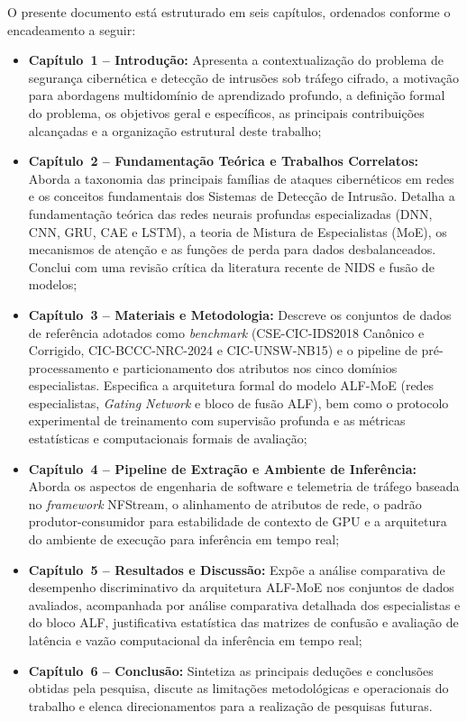 O presente documento está estruturado em seis capítulos, ordenados conforme o encadeamento a seguir:
\begin{itemize}
    \item \textbf{Capítulo~1 -- Introdução:} Apresenta a contextualização do problema de segurança cibernética e detecção de intrusões sob tráfego cifrado, a motivação para abordagens multidomínio de aprendizado profundo, a definição formal do problema, os objetivos geral e específicos, as principais contribuições alcançadas e a organização estrutural deste trabalho;
    \item \textbf{Capítulo~2 -- Fundamentação Teórica e Trabalhos Correlatos:} Aborda a taxonomia das principais famílias de ataques cibernéticos em redes e os conceitos fundamentais dos Sistemas de Detecção de Intrusão. Detalha a fundamentação teórica das redes neurais profundas especializadas (DNN, CNN, GRU, CAE e LSTM), a teoria de Mistura de Especialistas (MoE), os mecanismos de atenção e as funções de perda para dados desbalanceados. Conclui com uma revisão crítica da literatura recente de NIDS e fusão de modelos;
    \item \textbf{Capítulo~3 -- Materiais e Metodologia:} Descreve os conjuntos de dados de referência adotados como \emph{benchmark} (CSE-CIC-IDS2018 Canônico e Corrigido, CIC-BCCC-NRC-2024 e CIC-UNSW-NB15) e o pipeline de pré-processamento e particionamento dos atributos nos cinco domínios especialistas. Especifica a arquitetura formal do modelo ALF-MoE (redes especialistas, \emph{Gating Network} e bloco de fusão ALF), bem como o protocolo experimental de treinamento com supervisão profunda e as métricas estatísticas e computacionais formais de avaliação;
    \item \textbf{Capítulo~4 -- Pipeline de Extração e Ambiente de Inferência:} Aborda os aspectos de engenharia de software e telemetria de tráfego baseada no \emph{framework} NFStream, o alinhamento de atributos de rede, o padrão produtor-consumidor para estabilidade de contexto de GPU e a arquitetura do ambiente de execução para inferência em tempo real;
    \item \textbf{Capítulo~5 -- Resultados e Discussão:} Expõe a análise comparativa de desempenho discriminativo da arquitetura ALF-MoE nos conjuntos de dados avaliados, acompanhada por análise comparativa detalhada dos especialistas e do bloco ALF, justificativa estatística das matrizes de confusão e avaliação de latência e vazão computacional da inferência em tempo real;
    \item \textbf{Capítulo~6 -- Conclusão:} Sintetiza as principais deduções e conclusões obtidas pela pesquisa, discute as limitações metodológicas e operacionais do trabalho e elenca direcionamentos para a realização de pesquisas futuras.
\end{itemize}

